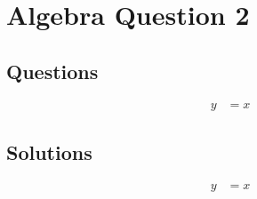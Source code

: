 \chapter{Algebra Question 2}
\label{chap:aq2}

\section{Questions}
\label{sec:aq2q}
\begin{align}
  y &= x
\end{align}

\section{Solutions}
\label{sec:aq2s}
\begin{align}
  y &= x
\end{align}